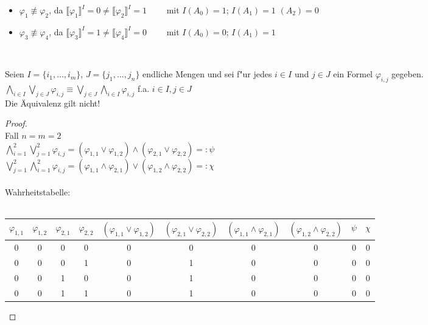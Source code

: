 \documentclass[a4paper,10pt]{article}
\begin{document}
	\begin{compactenum} [(a)]
		\item
		\begin{itemize}
			\item $ \varphi_1 \not\equiv \varphi_2$, da $ \llbracket \varphi_1 \rrbracket ^I = 0 \neq \llbracket \varphi_2 \rrbracket ^I = 1 \qquad$ mit $ I(A_0) = 1 $; $ I(A_1) = 1 $ $ (A_2) = 0 $
			\item $ \varphi_3 \not\equiv \varphi_4$, da $ \llbracket \varphi_3 \rrbracket ^I = 1 \neq \llbracket \varphi_4 \rrbracket ^I = 0 \qquad$ mit $ I(A_0) = 0 $; $ I(A_1) = 1 $
		\end{itemize}\
		\item Seien $I = \{i_1, \dots , i_m\}$,  $J = \{j_1, \dots , j_n\} $ endliche Mengen und sei f"ur jedes $i \in I$ und $j \in J$ ein Formel $\varphi_{i, j}$ gegeben.\\
		$\bigwedge\limits_{i \in I} \bigvee\limits_{j \in J} \varphi_{i, j} \equiv \bigvee\limits_{j \in J} \bigwedge\limits_{i \in I} \varphi_{i, j}$ f.a. $i \in I, j\in J$\\
		Die Äquivalenz gilt nicht!
		\begin{proof}\ \\
			Fall $n = m = 2$\\
			$\bigwedge\limits_{i = 1}^2 \bigvee\limits_{j = 1}^2 \varphi_{i, j} = (\varphi_{1,1} \vee \varphi_{1,2}) \wedge (\varphi_{2,1} \vee \varphi_{2,2}) =: \psi$\\
		    $\bigvee\limits_{j = 1}^2 \bigwedge\limits_{i = 1}^2  \varphi_{i, j} = (\varphi_{1,1} \wedge \varphi_{2,1}) \vee (\varphi_{1,2} \wedge \varphi_{2,2}) =: \chi$\\\\
		    Wahrheitstabelle:\\ \\
		   \begin{tabular}{cccc|c|c|c|c|c|c}
		   	$\varphi_{1,1}$ & $\varphi_{1,2}$ & $\varphi_{2,1}$ & $\varphi_{2,2}$ & $(\varphi_{1,1} \vee \varphi_{1,2})$ & $(\varphi_{2,1} \vee \varphi_{2,2})$ & $(\varphi_{1,1} \wedge \varphi_{2,1})$ & $(\varphi_{1,2} \wedge \varphi_{2,2})$ & $\psi$ & $\chi$ \\ \hline
		   	0 & 0 & 0 & 0 & 0 & 0 & 0 & 0 & 0 & 0\\
		   	0 & 0 & 0 & 1 & 0 & 1 & 0 & 0 & 0 & 0\\
		   	0 & 0 & 1 & 0 & 0 & 1 & 0 & 0 & 0 & 0\\
		   	0 & 0 & 1 & 1 & 0 & 1 & 0 & 0 & 0 & 0\\

\end{tabular}
\end{proof}
\end{compactenum}
\end{document}

